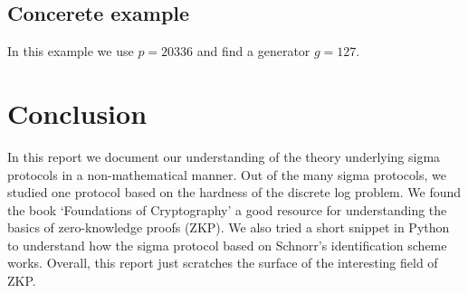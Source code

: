 \documentclass[12pt]{article}
\begin{document}
	\subsection{Concerete example}
	
	In this example we use $p = 20336$ and find a generator $g = 127$.
	
	\section{Conclusion}
	
	In this report we document our understanding of the theory underlying sigma protocols in a non-mathematical manner.  Out of the many sigma protocols, we studied one protocol based on the hardness of the discrete log problem.  We found the book `Foundations of Cryptography' \cite{Goldreich_2001} a good resource for understanding the basics of zero-knowledge proofs (ZKP).  We also tried a short snippet in Python to understand how the sigma protocol based on Schnorr's identification scheme works.  Overall, this report just scratches the surface of the interesting field of ZKP.
	
	\printbibliography
\end{document}
